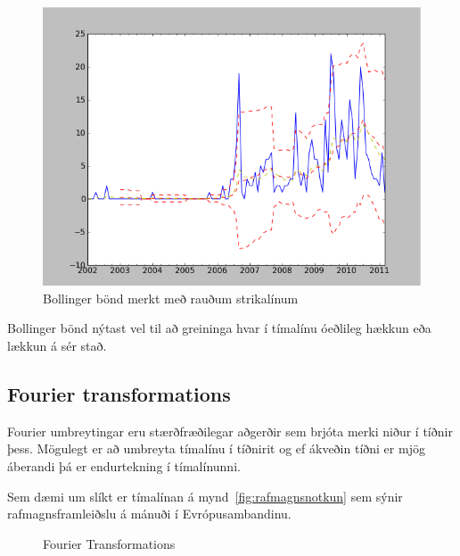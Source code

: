 \documentclass{article}
\begin{document}
\begin{figure}[H]
  \centering
  \includegraphics[width=.58\textwidth]{Bollinger.png} 
  \caption{Bollinger bönd merkt með rauðum strikalínum} 
\end{figure}


Bollinger bönd nýtast vel til að greininga hvar í
tímalínu óeðlileg hækkun eða lækkun á sér stað.




\subsection{Fourier transformations} 

Fourier umbreytingar eru stærðfræðilegar aðgerðir sem brjóta merki niður í tíðnir þess. 
Mögulegt er að umbreyta tímalínu í tíðnirit og ef ákveðin tíðni er mjög áberandi 
þá er endurtekning í tímalínunni. 

Sem dæmi um slíkt er tímalínan á mynd~\ref{fig:rafmagnsnotkun} sem sýnir
rafmagnsframleiðslu á mánuði í Evrópusambandinu.


\begin{figure}[H]
  \centering 
      \caption{Fourier Transformations}
  \label{fig:fourier}
\end{figure}
\end{document}
